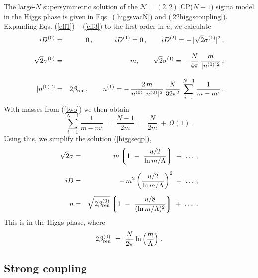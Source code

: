 \documentclass[epsfig,12pt]{article}
\def\beq{\begin{equation}}
\def\eeq{\end{equation}}
\def\beqn{\begin{eqnarray}}
\def\eeqn{\end{eqnarray}}
\def\beqn{\begin{eqnarray}}
\def\eeqn{\end{eqnarray}}
\def\beq{\begin{equation}}
\def\eeq{\end{equation}}
\newcommand{\ntwot}{${\mathcal N}= \left(2,2\right) $ }
\newcommand{\ov}{\overline}
\newcommand{\lgr}{\left\lgroup}
\newcommand{\rgr}{\right\rgroup}
\newcommand{\nz}{{n^{(0)}}}
\newcommand{\no}{{n^{(1)}}}
\newcommand{\bnz}{{\ov{n}{}^{(0)}}}
\newcommand{\Dz}{{D^{(0)}}}
\newcommand{\Do}{{D^{(1)}}}
\newcommand{\sigz}{{\sigma^{(0)}}}
\newcommand{\sigo}{{\sigma^{(1)}}}
\begin{document}
{	The large-$N$ supersymmetric solution of the \ntwot CP($N-1$) sigma model
	in the Higgs phase is
given in Eqs.~(\ref{higgsvacN}) and (\ref{22higgscoupling}).
Expanding Eqs. (\ref{eff1}) -- (\ref{eff3}) to the first order in $u$, we calculate
\beqn
	i \Dz 
	&=&
	 0\,,                    \qquad\quad      i\Do   = 0\,,  
			\qquad iD^{(2)} =  -\,|\sqrt{2}\sigo|^2\,, 
			\nonumber\\[3mm]
	\sqrt{2}\sigz &=& m,  \qquad       
	\sqrt{2}\sigo  = -\,\frac{N}{4\pi}\,\frac{m}{|\nz|^2}\,, 
	 \nonumber\\[3mm]
	|\nz|^2 
	&=&
	2\beta_{\rm ren}\,,              \qquad   
	\no =  -\,\frac{2\,m}{\bnz\,|\nz|^2}\,\frac{N}{32\pi^2}\,\sum_{i=1}^{N-1} \frac{1}{m - m^i}\,.
			\label{higgseqp}
			\eeqn
	With masses from (\ref{two}) we then obtain
\beq
	\sum_{i=1}^{N-1} \frac{1}{m - m^i} ~=~ \frac{N-1}{2m} ~=~ \frac{N}{2m} ~+~ O(1)\,.
	\label{higgseqpp}
\eeq
Using this, we simplify the solution (\ref{higgseqp}),
\beqn
%
	\sqrt{2}\sigma 
	&=&
	 m \lgr 1 ~-~ \frac{u/2}{{\rm ln}\, m/\Lambda} \rgr ~+~ \ldots \,,
	\nonumber\\[2mm]
%
	i D  
	&=&
	-\, m^2 \left( \frac{u/2}{{\rm ln}\, m/\Lambda} \right)^2  ~+~ \ldots\,,
	 \label{finhi}
	\\[2mm]
%
	n 
	&=&
	\sqrt{2\beta^{(0)}_{\rm ren}} \lgr 
			1 ~-~ \frac{ u/8 } { ( {\rm ln}\, m/\Lambda )^2 } \rgr ~+~ \ldots\;.
	\nonumber
\eeqn
This is in the Higgs phase, where
$$
2\beta^{(0)}_{\rm ren} ~=~ \frac{N}{2\pi}\,{\rm ln}\left(\frac{m}{\Lambda}\right)\,.
$$

%
%
\subsection{Strong coupling}
\label{subsestrco}


}
\end{document}
